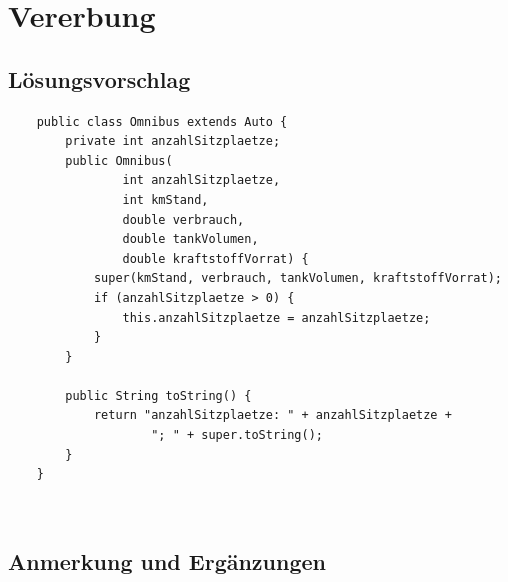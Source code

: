 \chapter{Vererbung}

\section{Lösungsvorschlag}


\begin{verbatim}
    public class Omnibus extends Auto {
        private int anzahlSitzplaetze;
        public Omnibus(
                int anzahlSitzplaetze,
                int kmStand,
                double verbrauch,
                double tankVolumen,
                double kraftstoffVorrat) {
            super(kmStand, verbrauch, tankVolumen, kraftstoffVorrat);
            if (anzahlSitzplaetze > 0) {
                this.anzahlSitzplaetze = anzahlSitzplaetze;
            }
        }

        public String toString() {
            return "anzahlSitzplaetze: " + anzahlSitzplaetze +
                    "; " + super.toString();
        }
    }
\end{verbatim}\\

\section{Anmerkung und Ergänzungen}

